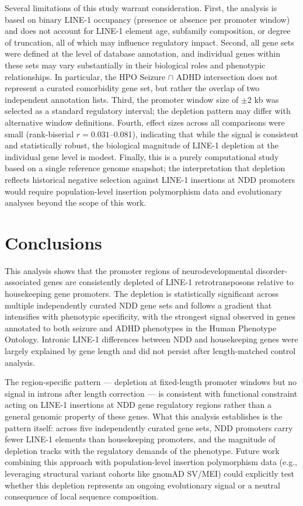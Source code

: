 \documentclass[11pt, a4paper]{article}
\begin{document}
Several limitations of this study warrant consideration.
First, the analysis is based on binary LINE-1 occupancy
(presence or absence per promoter window) and does not account
for LINE-1 element age, subfamily composition, or degree of
truncation, all of which may influence regulatory impact.
Second, all gene sets were defined at the level of database
annotation, and individual genes within these sets may vary
substantially in their biological roles and phenotypic
relationships. In particular, the HPO Seizure $\cap$ ADHD
intersection does not represent a curated comorbidity gene
set, but rather the overlap of two independent annotation
lists. Third, the promoter window size of $\pm$2 kb was
selected as a standard regulatory interval; the depletion
pattern may differ with alternative window definitions.
Fourth, effect sizes across all comparisons were small
(rank-biserial $r = 0.031$--0.081), indicating that while
the signal is consistent and statistically robust, the
biological magnitude of LINE-1 depletion at the individual
gene level is modest. Finally, this is a purely computational
study based on a single reference genome snapshot; the
interpretation that depletion reflects historical negative
selection against LINE-1 insertions at NDD promoters would
require population-level insertion polymorphism data and
evolutionary analyses beyond the scope of this work.

\section*{Conclusions}

This analysis shows that the promoter regions of
neurodevelopmental disorder-associated genes are consistently
depleted of LINE-1 retrotransposons relative to housekeeping
gene promoters. The depletion is statistically significant
across multiple independently curated NDD gene sets and
follows a gradient that intensifies with phenotypic specificity,
with the strongest signal observed in genes annotated to both
seizure and ADHD phenotypes in the Human Phenotype Ontology.
Intronic LINE-1 differences between NDD and housekeeping genes
were largely explained by gene length and did not persist after
length-matched control analysis.

The region-specific pattern --- depletion at fixed-length
promoter windows but no signal in introns after length
correction --- is consistent with functional constraint acting
on LINE-1 insertions at NDD gene regulatory regions rather than
a general genomic property of these genes. What this
analysis establishes is the pattern itself: across five
independently curated gene sets, NDD promoters carry fewer
LINE-1 elements than housekeeping promoters, and the magnitude
of depletion tracks with the regulatory demands of the
phenotype. Future work combining this approach with population-level insertion polymorphism data (e.g., leveraging structural variant cohorts like gnomAD SV/MEI) could explicitly test whether this depletion represents an ongoing evolutionary signal or a neutral consequence of local sequence composition.
\end{document}
